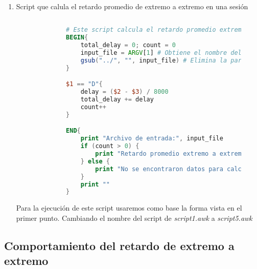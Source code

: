 \begin{enumerate}
\begin{figure}[H]
\begin{lstlisting}[frame=single, breaklines=true, basicstyle=\footnotesize\ttfamily, breakatwhitespace=false, 
      columns=flexible, tabsize=2, showstringspaces=false, language=bash]
      awk -f ./script1.awk ../1.txt > ./output
      
    \end{lstlisting}
  \end{figure}

  \newpage
  \item Script que calula el retardo promedio de extremo a extremo en una sesi\'on
  \begin{figure}[H]
    \centering
    \begin{lstlisting}[frame=single, breaklines=true, basicstyle=\footnotesize\ttfamily, breakatwhitespace=false, 
        columns=flexible, tabsize=2, showstringspaces=false, language=AWK] 
  
        # Este script calcula el retardo promedio extremo a extremo.
        BEGIN{
            total_delay = 0; count = 0
            input_file = ARGV[1] # Obtiene el nombre del archivo del parametro de la ejeucion
            gsub("../", "", input_file) # Elimina la parte inicial del parametro para tener nada mas el nombre del archivo  
        }

        $1 == "D"{
            delay = ($2 - $3) / 8000
            total_delay += delay
            count++
        }

        END{
            print "Archivo de entrada:", input_file
            if (count > 0) {
                print "Retardo promedio extremo a extremo:", total_delay / count
            } else {
                print "No se encontraron datos para calcular el retardo promedio."
            }
            print ""
        }
    \end{lstlisting}
    \label{fig:scriptRetardoExtremoExtremoSesion}
  \end{figure}
  \noindent Para la ejecuci\'on de este script usaremos como base la forma vista en el primer punto. 
  Cambiando el nombre del script de \textit{script1.awk} a \textit{script5.awk}
\end{enumerate}

\subsection*{Comportamiento del retardo de extremo a extremo}